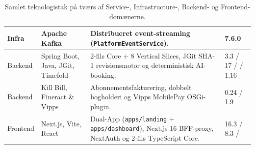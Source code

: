 \documentclass[11pt,a4paper]{article}
\begin{document}
\begin{table}[H]
\begin{tabularx}{\textwidth}{P{2.0cm} P{3.6cm} Y P{2.2cm}}
\midrule
Infra & Apache Kafka & Distribueret event-streaming (\texttt{PlatformEventService}). & 7.6.0 \\
\midrule
Backend & Spring Boot, Java, JGit, Timefold & 2-fils Core + 8 Vertical Slices, JGit SHA-1 revisionsmotor og deterministisk AI-booking. & 3.3 / 17 / / 1.16 \\
\midrule
Backend & Kill Bill, Fineract \& Vipps & Abonnementsfakturering, dobbelt bogholderi og Vipps MobilePay OSGi-plugin. & 0.24 / 1.9 \\
\midrule
Frontend & Next.js, Vite, React & Dual-App (\texttt{apps/landing} + \texttt{apps/dashboard}), Next.js 16 BFF-proxy, NextAuth og 2-fils TypeScript Core. & 16.3 / 8.3 / \\
\bottomrule
\end{tabularx}
\caption{Samlet teknologistak på tværs af Service-, Infrastructure-, Backend- og Frontend-domænerne.}
\label{tab:tech_stack}
\end{table}
\end{document}
